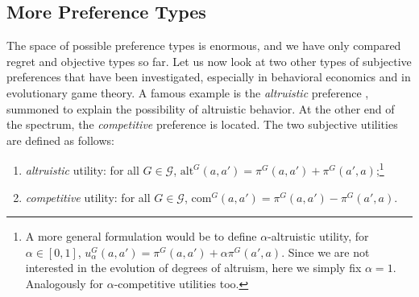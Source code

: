 \documentclass[fleqn,reqno,12pt]{article}
\theoremstyle{Satz}
\theoremstyle{Bsp}
\begin{document}
\subsection{More Preference Types}
\label{sec:more-types}

The space of possible preference types is enormous, and we have only compared regret
and objective types so far. Let us now
look at two other types of subjective preferences that have been investigated, especially
in behavioral economics and in evolutionary game theory. A famous example is the
\textit{altruistic} preference \citep[e.g.,][]{Beck76,BestGuth98}, summoned to explain the
possibility of altruistic behavior. At the other end of the spectrum, the \emph{competitive}
preference is located. The two subjective utilities are defined as follows:
\begin{enumerate}
\item \textit{altruistic} utility: for all $G \in \mathcal{G}$, $\text{alt}^G(a,a') = \pi^G(a,a') + \pi^G(a',a)$;\footnote{A
    more general formulation would be to define $ \alpha$-altruistic utility, for
    $\alpha \in [0,1]$,
    $ u^G_\alpha(a, a')=\pi^G(a,a') + \alpha \pi^G(a',a)$. Since we are not
    interested in the evolution of degrees of altruism, here we simply fix $ \alpha = 1 $. Analogously for $\alpha$-competitive utilities too.}
\item \textit{competitive} utility: for all $G \in \mathcal{G}$, $\text{com}^G(a,a') = \pi^G(a,a') - \pi^G(a',a)$.
\end{enumerate}
\end{document}
